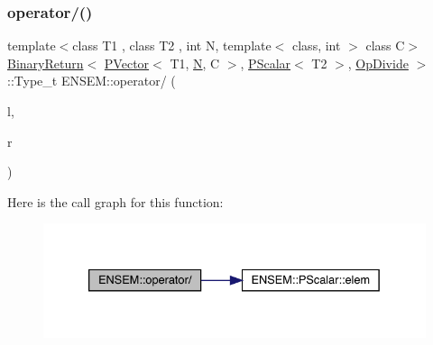 \mbox{\label{group__primvector_gac0d72c4d06047ab6be5503cc1b557a16}} 
\subsubsection{\texorpdfstring{operator/()}{operator/()}}
{\footnotesize\ttfamily template$<$class T1 , class T2 , int N, template$<$ class, int $>$ class C$>$ \\
\mbox{\hyperlink{structENSEM_1_1BinaryReturn}{Binary\+Return}}$<$ \mbox{\hyperlink{classENSEM_1_1PVector}{P\+Vector}}$<$ T1, \mbox{\hyperlink{operator__name__util_8cc_a7722c8ecbb62d99aee7ce68b1752f337}{N}}, C $>$, \mbox{\hyperlink{classENSEM_1_1PScalar}{P\+Scalar}}$<$ T2 $>$, \mbox{\hyperlink{structENSEM_1_1OpDivide}{Op\+Divide}} $>$\+::Type\+\_\+t E\+N\+S\+E\+M\+::operator/ (\begin{DoxyParamCaption}\item[{const \mbox{\hyperlink{classENSEM_1_1PVector}{P\+Vector}}$<$ T1, \mbox{\hyperlink{operator__name__util_8cc_a7722c8ecbb62d99aee7ce68b1752f337}{N}}, C $>$ \&}]{l,  }\item[{const \mbox{\hyperlink{classENSEM_1_1PScalar}{P\+Scalar}}$<$ T2 $>$ \&}]{r }\end{DoxyParamCaption})\hspace{0.3cm}{\ttfamily [inline]}}

Here is the call graph for this function\+:\nopagebreak
\begin{figure}[H]
\begin{center}
\leavevmode
\includegraphics[width=333pt]{d3/dc4/group__primvector_gac0d72c4d06047ab6be5503cc1b557a16_cgraph}
\end{center}
\end{figure}
\mbox{\label{group__primvector_ga6745ec17233acc0af26851238d72789a}} 
